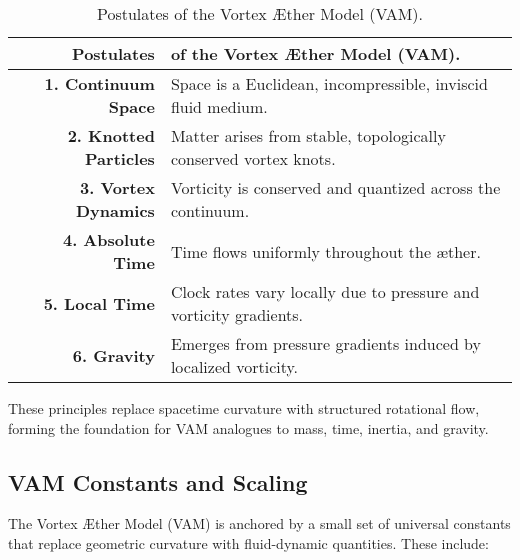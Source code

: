 \begin{table}[h!]
    \centering
    \begin{tabular}{rl}
        \toprule
        \hline
        \textbf{Postulates} & of the Vortex \AE ther Model (VAM).\\
        \hline
        \textbf{1. Continuum Space} & Space is a Euclidean, incompressible, inviscid fluid medium. \\
        \midrule
        \textbf{2. Knotted Particles} & Matter arises from stable, topologically conserved vortex knots. \\
        \midrule
        \textbf{3. Vortex Dynamics} & Vorticity is conserved and quantized across the continuum. \\
        \midrule
        \textbf{4. Absolute Time} & Time flows uniformly throughout the æther. \\
        \midrule
        \textbf{5. Local Time} & Clock rates vary locally due to pressure and vorticity gradients. \\
        \midrule
        \textbf{6. Gravity} & Emerges from pressure gradients induced by localized vorticity. \\
        \hline
        \bottomrule
    \end{tabular}
    \caption{Postulates of the Vortex Æther Model (VAM).\\}
    These principles replace spacetime curvature with structured rotational flow, \\
    forming the foundation for VAM analogues to mass, time, inertia, and gravity.
    \label{tab:postulates}
\end{table}


\subsection*{VAM Constants and Scaling}

The Vortex Æther Model (VAM) is anchored by a small set of universal constants that replace geometric curvature with fluid-dynamic quantities. These include:


